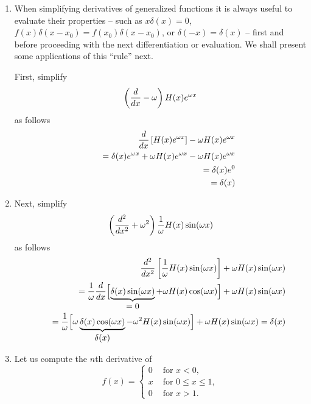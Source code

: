{\begin{enumerate}
\item
When simplifying derivatives of generalized functions it is always useful to evaluate their properties
--
such as $x\delta(x)=0$, $f(x)\delta(x-x_0)=f(x_0)\delta(x-x_0)$, or $\delta (-x)=\delta (x)$
--
first and  before proceeding with the next differentiation or evaluation.
We shall present some applications of this ``rule'' next.

First, simplify
\begin{equation}
\left({d\over dx}-\omega \right)H (x)e^{\omega x}
\end{equation}
as follows
\begin{equation}
\begin{split}
 {d\over dx}\left[H(x)e^{\omega
x}\right]-\omega H(x)e^{\omega x}\\
\qquad =
   \delta(x)e^{\omega x}+\omega H(x)e^{\omega x}-\omega H(x)
   e^{\omega x}\\
\qquad =
   \delta(x)e^{0}
   \\
\qquad =  \delta(x)
\end{split}
\end{equation}


\item
Next, simplify
\begin{equation}
\left({d^2\over dx^2}+\omega^2 \right){1\over \omega }H
 (x)\sin (\omega x)
\end{equation}
as follows
\begin{equation}
\begin{split}
{d^2\over dx^2}\left[{1\over\omega}H(x)\sin(\omega
x)\right]+\omega H(x)
      \sin(\omega x)\\
   \qquad =   {1\over\omega}{d\over dx}\Bigl[\underbrace{\delta(x)\sin(\omega x)}_
      {\mbox{$=0$}}+\omega H(x)\cos(\omega x)\Bigr]+\omega H(x)
      \sin(\omega x)\\
  \qquad =   {1\over\omega}\Bigl[\omega\underbrace{\delta(x)\cos(\omega x)}_
      {\mbox{$\delta(x)$}}-\omega^2H(x)\sin(\omega x)\Bigr]+
      \omega H(x)\sin(\omega x)=\delta(x)
\end{split}
\end{equation}



\item
Let us compute the $n$th derivative of
\begin{equation}
f (x)
=
\begin{cases}
0  & \textrm{ for }    x< 0 ,\\
x  & \textrm{ for }   0\le x\le 1, \\
0  &\textrm{ for }  x>1.
\end{cases}
\end{equation}


\end{enumerate}}

